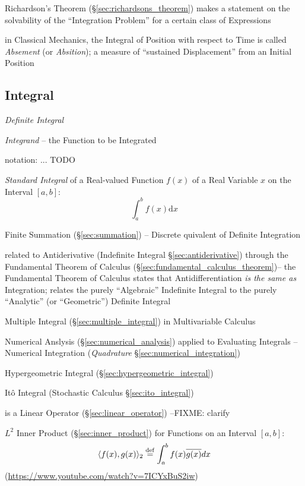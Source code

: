 {Richardson's Theorem (\S\ref{sec:richardsons_theorem}) makes a statement on the
solvability of the ``Integration Problem'' for a certain class of Expressions

in Classical Mechanics, the Integral of Position with respect to Time is called
\emph{Absement} (or \emph{Absition}); a measure of ``sustained Displacement''
from an Initial Position



\subsection{Integral}\label{sec:integral}

\emph{Definite Integral}

\emph{Integrand} -- the Function to be Integrated

notation:
... TODO

\emph{Standard Integral} of a Real-valued Function $f(x)$ of a Real Variable $x$
on the Interval $[a,b]$:
\[
  \int_a^b f(x) \mathrm{d}x
\]

\fist Finite Summation (\S\ref{sec:summation}) -- Discrete quivalent of
Definite Integration

\fist related to Antiderivative (Indefinite Integral \S\ref{sec:antiderivative})
through the Fundamental Theorem of Calculus
(\S\ref{sec:fundamental_calculus_theorem})--
the Fundamental Theorem of Calculus states that Antidifferentiation \emph{is the
  same as} Integration;
relates the purely ``Algebraic'' Indefinite Integral to the purely ``Analytic''
(or ``Geometric'') Definite Integral

\fist Multiple Integral (\S\ref{sec:multiple_integral}) in Multivariable
Calculus

\fist Numerical Anslysis (\S\ref{sec:numerical_analysis}) applied to Evaluating
Integrals -- Numerical Integration (\emph{Quadrature}
\S\ref{sec:numerical_integration})

\fist Hypergeometric Integral (\S\ref{sec:hypergeometric_integral})

\fist It\^o Integral (Stochastic Calculus \S\ref{sec:ito_integral})

is a Linear Operator (\S\ref{sec:linear_operator}) --FIXME: clarify

$L^2$ Inner Product (\S\ref{sec:inner_product}) for Functions on an Interval
$[a, b]$:
\[
  \langle{f(x), g(x)}\rangle_2 \stackrel{\mathrm{def}}= \int_a^b f(x) \overline{g(x)} dx
\]
(\url{https://www.youtube.com/watch?v=7ICYxBuS2iw})

}
